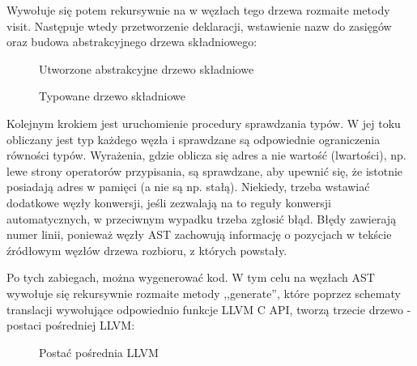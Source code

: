 Wywołuje się potem rekursywnie na w węzłach tego drzewa rozmaite metody visit. Następuje wtedy przetworzenie deklaracji, wstawienie nazw do zasięgów oraz budowa abstrakcyjnego drzewa składniowego:
\begin{landscape}
\begin{figure}[p]
    \centering
    
    \caption{Utworzone abstrakcyjne drzewo składniowe}
\end{figure}
\end{landscape}

\begin{landscape}
\begin{figure}[p]
    \centering
    
    \caption{Typowane drzewo składniowe}
\end{figure}
\end{landscape}
Kolejnym krokiem jest uruchomienie procedury sprawdzania typów. W jej toku obliczany jest typ każdego węzła i sprawdzane są odpowiednie ograniczenia równości typów. Wyrażenia, gdzie oblicza się adres a nie wartość (lwartości), np. lewe strony operatorów przypisania, są sprawdzane, aby upewnić się, że istotnie posiadają adres w pamięci (a nie są np. stałą). Niekiedy, trzeba wstawiać dodatkowe węzły konwersji, jeśli zezwalają na to reguły konwersji automatycznych, w przeciwnym wypadku trzeba zgłosić błąd. Błędy zawierają numer linii, ponieważ węzły AST zachowują informację o pozycjach w tekście źródłowym węzłów drzewa rozbioru, z których powstały. 

Po tych zabiegach, można wygenerować kod. W tym celu na węzłach AST wywołuje się rekursywnie rozmaite metody ,,generate'', które poprzez schematy translacji wywołujące odpowiednio funkcje LLVM C API, tworzą trzecie drzewo - postaci pośredniej LLVM:

\begin{figure}[h]
    \centering
    
    \caption{Postać pośrednia LLVM }
\end{figure}

